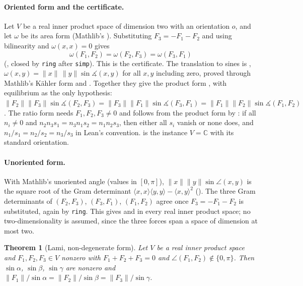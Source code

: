 \documentclass[11pt]{article}
\newtheorem{theorem}{Theorem}
\theoremstyle{definition}
\theoremstyle{remark}
\newcommand{\lean}[1]{\texttt{#1}}
\newcommand{\CC}{\mathbb{C}}
\begin{document}
\paragraph{Oriented form and the certificate.} Let $V$ be a real inner product space of dimension
two with an orientation $o$, and let $\omega$ be its area form (Mathlib's
). Substituting $F_3=-F_1-F_2$ and using bilinearity and
$\omega(x,x)=0$ gives
\begin{equation}\label{eq:lami}
\omega(F_1,F_2)=\omega(F_2,F_3)=\omega(F_3,F_1)
\end{equation}
(, closed by \lean{ring} after \lean{simp}). This is the certificate.
The translation to sines is ,
$\omega(x,y)=\|x\|\,\|y\|\sin\measuredangle(x,y)$ for all $x,y$ including zero, proved through
Mathlib's K\"ahler form and . Together they give the product form
, with equilibrium as the only hypothesis:
$\|F_2\|\|F_3\|\sin\measuredangle(F_2,F_3)=\|F_3\|\|F_1\|\sin\measuredangle(F_3,F_1)=\|F_1\|\|F_2\|\sin\measuredangle(F_1,F_2)$.
The ratio form  needs $F_1,F_2,F_3\ne0$ and follows from the product
form by : if all $n_i\ne0$ and
$n_2n_3s_1=n_3n_1s_2=n_1n_2s_3$, then either all $s_i$ vanish or none does, and
$n_1/s_1=n_2/s_2=n_3/s_3$ in Lean's convention.  is the instance
$V=\CC$ with its standard orientation.

\paragraph{Unoriented form.} With Mathlib's unoriented angle 
(values in $[0,\pi]$), $\|x\|\|y\|\sin\angle(x,y)$ is the square root of the Gram determinant
$\langle x,x\rangle\langle y,y\rangle-\langle x,y\rangle^2$
(). The three Gram determinants of $(F_2,F_3)$,
$(F_3,F_1)$, $(F_1,F_2)$ agree once $F_3=-F_1-F_2$ is substituted, again by \lean{ring}. This
gives  and  in every real inner product space; no
two-dimensionality is assumed, since the three forces span a space of dimension at most two.

\begin{theorem}[Lami, non-degenerate form]\label{thm:lami}
Let $V$ be a real inner product space and $F_1,F_2,F_3\in V$ nonzero with $F_1+F_2+F_3=0$ and
$\angle(F_1,F_2)\notin\{0,\pi\}$. Then $\sin\alpha$, $\sin\beta$, $\sin\gamma$ are nonzero and
$\|F_1\|/\sin\alpha=\|F_2\|/\sin\beta=\|F_3\|/\sin\gamma$.
\end{theorem}
\end{document}
